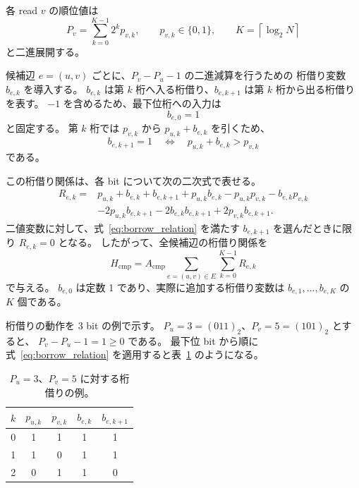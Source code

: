\documentclass[a4j,10pt]{ujarticle}
\begin{document}
各 read $v$ の順位値は
\begin{equation}
P_v
=
\sum_{k=0}^{K-1}2^k p_{v,k},
\qquad
p_{v,k}\in\{0,1\},
\qquad
K=\left\lceil\log_2N\right\rceil
\label{eq:latent_vertex_rank}
\end{equation}
と二進展開する。

候補辺 $e=(u,v)$ ごとに、$P_v-P_u-1$ の二進減算を行うための
桁借り変数 $b_{e,k}$ を導入する。
$b_{e,k}$ は第 $k$ 桁へ入る桁借り、$b_{e,k+1}$ は第 $k$ 桁から出る桁借りを表す。
$-1$ を含めるため、最下位桁への入力は
\begin{equation}
b_{e,0}=1
\end{equation}
と固定する。
第 $k$ 桁では $p_{v,k}$ から $p_{u,k}+b_{e,k}$ を引くため、
\begin{equation}
b_{e,k+1}=1
\quad\Longleftrightarrow\quad
p_{u,k}+b_{e,k}>p_{v,k}
\label{eq:borrow_relation}
\end{equation}
である。

この桁借り関係は、各 bit について次の二次式で表せる。
\begin{align}
R_{e,k}
={}&
p_{u,k}+b_{e,k}+b_{e,k+1}
+p_{u,k}b_{e,k}
-p_{u,k}p_{v,k}
-b_{e,k}p_{v,k}
\nonumber\\
&-2p_{u,k}b_{e,k+1}
-2b_{e,k}b_{e,k+1}
+2p_{v,k}b_{e,k+1}.
\label{eq:borrow_quadratic_penalty}
\end{align}
二値変数に対して、式~\eqref{eq:borrow_relation} を満たす
$b_{e,k+1}$ を選んだときに限り $R_{e,k}=0$ となる。
したがって、全候補辺の桁借り関係を
\begin{equation}
H_{\mathrm{cmp}}
=
A_{\mathrm{cmp}}
\sum_{e=(u,v)\in E}
\sum_{k=0}^{K-1}
R_{e,k}
\label{eq:comparator_hamiltonian}
\end{equation}
で与える。
$b_{e,0}$ は定数 1 であり、実際に追加する桁借り変数は
$b_{e,1},\ldots,b_{e,K}$ の $K$ 個である。

桁借りの動作を 3 bit の例で示す。
$P_u=3=(011)_2$、$P_v=5=(101)_2$ とすると、
$P_v-P_u-1=1\geq 0$ である。
最下位 bit から順に式~\eqref{eq:borrow_relation} を適用すると表~\ref{tab:borrow_example} のようになる。

\begin{table}[htbp]
\centering
\caption{$P_u=3$、$P_v=5$ に対する桁借りの例。}
\label{tab:borrow_example}
\begin{tabular}{ccccc}
\hline
$k$ & $p_{u,k}$ & $p_{v,k}$ & $b_{e,k}$ & $b_{e,k+1}$ \\
\hline
0 & 1 & 1 & 1 & 1 \\
1 & 1 & 0 & 1 & 1 \\
2 & 0 & 1 & 1 & 0 \\
\hline
\end{tabular}
\end{table}
\end{document}
